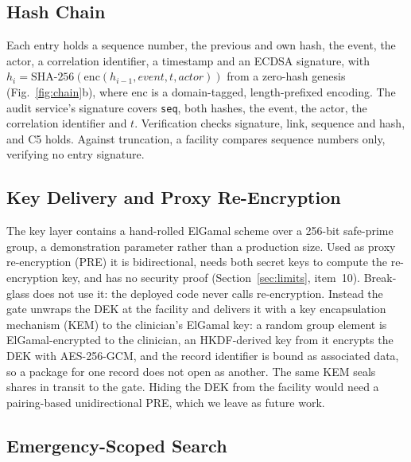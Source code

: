 \subsection{Hash Chain}

Each entry holds a sequence number, the previous and own hash, the event, the
actor, a correlation identifier, a timestamp and an ECDSA signature, with
$h_i=\mathrm{SHA\text{-}256}(\mathrm{enc}(h_{i-1},\mathit{event},t,\mathit{actor}))$
from a zero-hash genesis (Fig.~\ref{fig:chain}b), where enc is a
domain-tagged, length-prefixed encoding.
The audit service's signature covers \texttt{seq}, both hashes, the event,
the actor, the correlation identifier and $t$.
Verification checks signature, link, sequence and hash, and C5 holds.
Against truncation, a facility compares sequence numbers only, verifying no
entry signature.

\subsection{Key Delivery and Proxy Re-Encryption}

The key layer contains a hand-rolled ElGamal scheme over a 256-bit safe-prime
group, a demonstration parameter rather than a production size.
Used as proxy re-encryption (PRE) it is bidirectional, needs both secret keys
to compute the re-encryption key, and has no security proof
(Section~\ref{sec:limits}, item~10).
Break-glass does not use it: the deployed code never calls re-encryption.
Instead the gate unwraps the DEK at the facility and delivers it with a key
encapsulation mechanism (KEM) to the clinician's ElGamal key: a random group
element is ElGamal-encrypted to the clinician, an HKDF-derived key from it
encrypts the DEK with AES-256-GCM, and the record identifier is bound as
associated data, so a package for one record does not open as another.
The same KEM seals shares in transit to the gate.
Hiding the DEK from the facility would need a pairing-based unidirectional
PRE, which we leave as future work.

\subsection{Emergency-Scoped Search}

